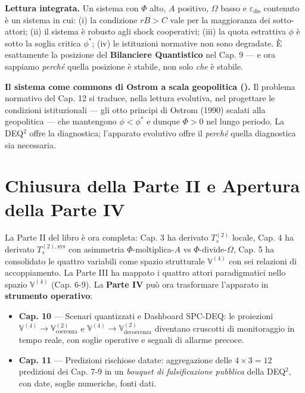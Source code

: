 \Proved{} \textbf{Lettura integrata.} Un sistema con \(\Phi\) alto, \(A\)
positivo, \(\Omega\) basso e \(\varepsilon_{\text{dis}}\) contenuto è un
sistema in cui: (i) la condizione \(rB > C\) vale per la maggioranza dei
sotto-attori; (ii) il sistema è robusto agli shock cooperativi; (iii) la
quota estrattiva \(\phi\) è sotto la soglia critica \(\phi^*\); (iv) le
istituzioni normative non sono degradate. È esattamente la posizione del
\textbf{Bilanciere Quantistico} nel Cap. 9 --- e ora sappiamo
\emph{perché} quella posizione è stabile, non solo \emph{che} è stabile.

\Hypoth{} \textbf{Il sistema come commons di Ostrom a scala geopolitica
(\Hypoth{}).} Il problema normativo del Cap. 12 si traduce, nella lettura
evolutiva, nel progettare le condizioni istituzionali --- gli otto
principi di Ostrom (1990) scalati alla geopolitica --- che mantengono
\(\phi < \phi^*\) e dunque \(\Phi > 0\) nel lungo periodo. La DEQ$^2$
offre la diagnostica; l'apparato evolutivo offre il \emph{perché} quella
diagnostica sia necessaria.



\section{Chiusura della Parte II e Apertura della Parte
IV}\label{chiusura-della-parte-ii-e-apertura-della-parte-iv}

La Parte II del libro è ora completa: Cap. 3 ha derivato \(T_s^{(2)}\)
locale, Cap. 4 ha derivato \(T_s^{(2),\text{sys}}\) con asimmetria
\(\Phi\)-moltiplica-\(A\) vs \(\Phi\)-divide-\(\Omega\), Cap. 5 ha
consolidato le quattro variabili come spazio strutturale
\(\mathbb{V}^{(4)}\) con sei relazioni di accoppiamento. La Parte III ha
mappato i quattro attori paradigmatici nello spazio \(\mathbb{V}^{(4)}\)
(Cap. 6-9). La \textbf{Parte IV} può ora trasformare l'apparato in
\textbf{strumento operativo}:

\begin{itemize}
\tightlist
\item
  \textbf{Cap. 10} --- Scenari quantizzati e Dashboard SPC-DEQ: le
  proiezioni \(\mathbb{V}^{(4)} \to \mathbb{V}^{(2)}_{\text{coerenza}}\)
  e \(\mathbb{V}^{(4)} \to \mathbb{V}^{(2)}_{\text{decoerenza}}\)
  diventano cruscotti di monitoraggio in tempo reale, con soglie
  operative e segnali di allarme precoce.
\item
  \textbf{Cap. 11} --- Predizioni rischiose datate: aggregazione delle
  \(4 \times 3 = 12\) predizioni dei Cap. 7-9 in un \emph{bouquet di
  falsificazione pubblica} della DEQ$^2$, con date, soglie numeriche, fonti
  dati.
\end{itemize}


